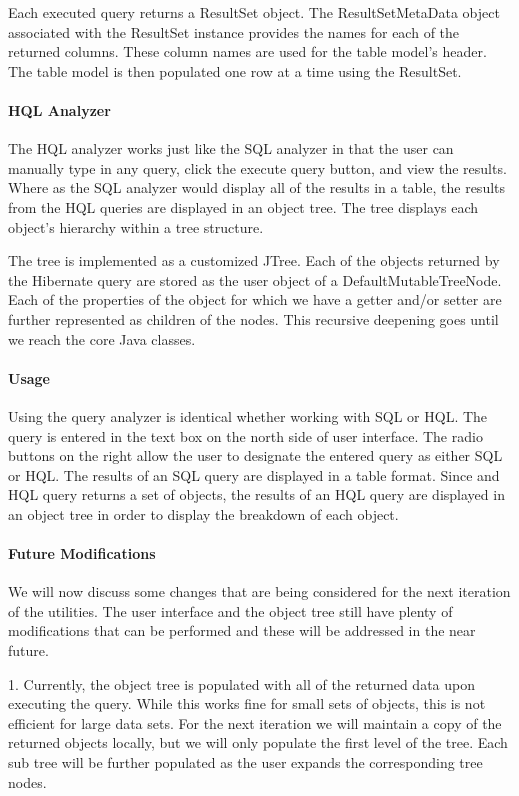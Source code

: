 Each executed query returns a ResultSet object. The ResultSetMetaData object associated with the ResultSet instance provides the names for each of the returned columns. These column names are used for the table model's header. The table model is then populated one row at a time using the ResultSet.

\paragraph{HQL Analyzer}

The HQL analyzer works just like the SQL analyzer in that the user can manually type in any query, click the execute query button, and view the results. Where as the SQL analyzer would display all of the results in a table, the results from the HQL queries are displayed in an object tree. The tree displays each object's hierarchy within a tree structure.

The tree is implemented as a customized JTree. Each of the objects returned by the Hibernate query are stored as the user object of a DefaultMutableTreeNode. Each of the properties of the object for which we have a getter and/or setter are further represented as children of the nodes. This recursive deepening goes until we reach the core Java classes.

\paragraph{Usage}
Using the query analyzer is identical whether working with SQL or HQL. The query is entered in the text box on the north side of user interface. The radio buttons on the right allow the user to designate the entered query as either SQL or HQL. The results of an SQL query are displayed in a table format. Since and HQL query returns a set of objects, the results of an HQL query are displayed in an object tree in order to display the breakdown of each object.

\paragraph{Future Modifications}
We will now discuss some changes that are being considered for the next iteration of the utilities. The user interface and the object tree still have plenty of modifications that can be performed and these will be addressed in the near future.

1. Currently, the object tree is populated with all of the returned data upon executing the query. While this works fine for small sets of objects, this is not efficient for large data sets. For the next iteration we will maintain a copy of the returned objects locally, but we will only populate the first level of the tree. Each sub tree will be further populated as the user expands the corresponding tree nodes.

